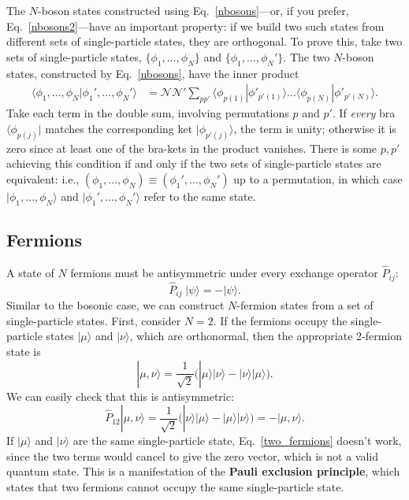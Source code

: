 \documentclass[prx,12pt]{revtex4-2}
\begin{document}
The $N$-boson states constructed using Eq.~\eqref{nbosons}---or, if
you prefer, Eq.~\eqref{nbosons2}---have an important property: if we
build two such states from different sets of single-particle states,
they are orthogonal.  To prove this, take two sets of single-particle
states, $\{\phi_1,\dots,\phi_N\}$ and $\{\phi_1,\dots,\phi_N'\}$.  The
two $N$-boson states, constructed by Eq.~\eqref{nbosons}, have the
inner product
\begin{align}
  \langle \phi_1, \dots, \phi_N | \phi_1',\dots, \phi_N'\rangle
  &= \mathcal{NN'}
  \sum_{pp'} \langle \phi_{p(1)} | \phi'_{p'(1)}\rangle \dots
  \langle \phi_{p(N)} | \phi'_{p'(N)}\rangle.
  \label{bosorthog}
\end{align}
Take each term in the double sum, involving permutations $p$ and $p'$.
If \textit{every} bra $\langle \phi_{p(j)}|$ matches the corresponding
ket $|\phi_{p'(j)}\rangle$, the term is unity; otherwise it is zero
since at least one of the bra-kets in the product vanishes.  There is
some $p, p'$ achieving this condition if and only if the two sets of
single-particle states are equivalent: i.e., $(\phi_1,\dots, \phi_N)
\equiv (\phi_1',\dots, \phi_N')$ up to a permutation, in which case $|
\phi_1, \dots, \phi_N \rangle$ and $| \phi_1',\dots, \phi_N'\rangle$
refer to the same state.

\subsection{Fermions}
\label{sec:fermions}

A state of $N$ fermions must be antisymmetric under every exchange
operator $\hat{P}_{ij}$:
\begin{equation}
  \hat{P}_{ij}\; |\psi\rangle = -|\psi\rangle.
\end{equation}
Similar to the bosonic case, we can construct $N$-fermion states from
a set of single-particle states.  First, consider $N=2$.  If the
fermions occupy the single-particle states $|\mu\rangle$ and
$|\nu\rangle$, which are orthonormal, then the appropriate 2-fermion
state is
\begin{equation}
  |\mu,\nu\rangle = \frac{1}{\sqrt{2}}
  \Big(|\mu\rangle|\nu\rangle - |\nu\rangle|\mu\rangle\Big).
  \label{two_fermions}
\end{equation}
We can easily check that this is antisymmetric:
\begin{equation}
  \hat{P}_{12} |\mu,\nu\rangle = \frac{1}{\sqrt{2}}
  \Big(|\nu\rangle|\mu\rangle - |\mu\rangle|\nu\rangle\Big)
  = - |\mu,\nu\rangle.
\end{equation}
If $|\mu\rangle$ and $|\nu\rangle$ are the same single-particle state,
Eq.~\eqref{two_fermions} doesn't work, since the two terms would
cancel to give the zero vector, which is not a valid quantum state.
This is a manifestation of the \textbf{Pauli exclusion principle},
which states that two fermions cannot occupy the same single-particle
state.
\end{document}

